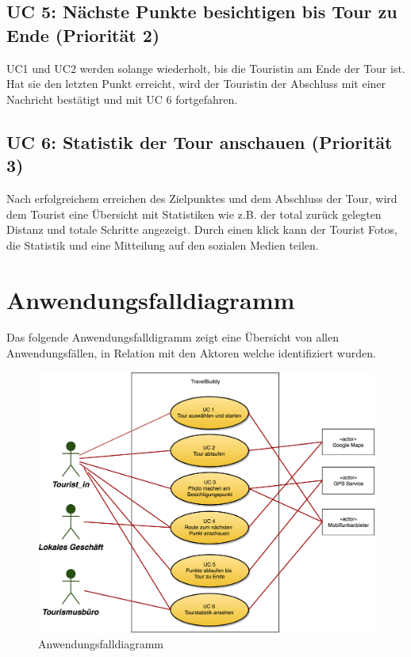 \documentclass[a4paper,10pt,xetex]{article}
\begin{document}
\subsection{UC 5: Nächste Punkte besichtigen bis Tour zu Ende (Priorität 2)}\label{uc-5-user-besucht-nuxe4chste-punkte-bis-tour-zu-ende.-priorituxe4t-2}
UC1 und UC2 werden solange wiederholt, bis die Touristin am Ende der Tour
ist. Hat sie den letzten Punkt erreicht, wird der Touristin der Abschluss
mit einer Nachricht bestätigt und mit UC 6 fortgefahren.


\subsection{UC 6: Statistik der Tour anschauen (Priorität 3)}\label{uc-6-user-sieht-statistik-der-tour.-priorituxe4t-3}
Nach erfolgreichem erreichen des Zielpunktes und dem Abschluss der Tour,
wird dem Tourist eine Übersicht mit Statistiken wie z.B. der total
zurück gelegten Distanz und totale Schritte angezeigt. Durch einen klick
kann der Tourist Fotos, die Statistik und eine Mitteilung auf den
sozialen Medien teilen.


\section{Anwendungsfalldiagramm}\label{anwendungsfalldiagramm}
Das folgende Anwendungsfalldigramm zeigt eine Übersicht von allen Anwendungsfällen, in Relation mit den Aktoren welche identifiziert wurden.

\begin{figure}
  \centering
  \includegraphics{Anwendungsfalldiagramm}
  \caption{Anwendungsfalldiagramm}
\end{figure}
\end{document}

